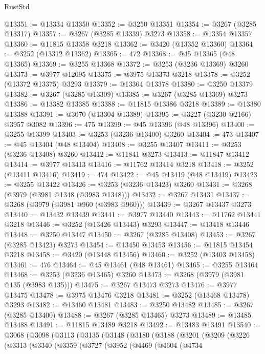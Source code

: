 \begin{lexlean}{RustStd}
\begin{coremodule}
@13351 := @13334 @13350
@13352 := @3250 @13351
@13354 := @3267 (@3285 @13317)
@13357 := @3267 (@3285 @13339) @3273
@13358 := @13354 @13357
@13360 := @11815 @13358 @3218
@13362 := @3420 (@13352 @13360)
@13364 := @3252 (@13312 @13362)
@13365 := 472
@13368 := @45 @13365 (@48 @13365)
@13369 := @3255 @13368
@13372 := @3253 (@3236 @13369) @3260
@13373 := @3977 @12095
@13375 := @3975 @13373 @3218
@13378 := @3252 (@13372 @13375) @3293
@13379 := @13364 @13378
@13380 := @3250 @13379
@13382 := @3267 (@3285 @13309)
@13385 := @3267 (@3285 @13369) @3273
@13386 := @13382 @13385
@13388 := @11815 @13386 @3218
@13389 := @13380 @13388
@13391 := @3070 (@13304 @13389)
@13395 := @3227 (@3230 @2166) @3957 @3082
@13396 := 475
@13399 := @45 @13396 (@48 @13396)
@13400 := @3255 @13399
@13403 := @3253 (@3236 @13400) @3260
@13404 := 473
@13407 := @45 @13404 (@48 @13404)
@13408 := @3255 @13407
@13411 := @3253 (@3236 @13408) @3260
@13412 := @11841 @3273
@13413 := @11847 @13412
@13414 := @3977 @13413
@13416 := @11762 @13414 @3218
@13418 := @3252 (@13411 @13416)
@13419 := 474
@13422 := @45 @13419 (@48 @13419)
@13423 := @3255 @13422
@13426 := @3253 (@3236 @13423) @3260
@13431 := @3268 (@3979 (@3981 @1348 (@3983 @1348)))
@13432 := @3267 @13431
@13437 := @3268 (@3979 (@3981 @960 (@3983 @960)))
@13439 := @3267 @13437 @3273
@13440 := @13432 @13439
@13441 := @3977 @13440
@13443 := @11762 @13441 @3218
@13446 := @3252 (@13426 @13443) @3293
@13447 := @13418 @13446
@13448 := @3250 @13447
@13450 := @3267 (@3285 @13408)
@13453 := @3267 (@3285 @13423) @3273
@13454 := @13450 @13453
@13456 := @11815 @13454 @3218
@13458 := @3420 (@13448 @13456)
@13460 := @3252 (@13403 @13458)
@13461 := 476
@13464 := @45 @13461 (@48 @13461)
@13465 := @3255 @13464
@13468 := @3253 (@3236 @13465) @3260
@13473 := @3268 (@3979 (@3981 @135 (@3983 @135)))
@13475 := @3267 @13473 @3273
@13476 := @3977 @13475
@13478 := @3975 @13476 @3218
@13481 := @3252 (@13468 @13478) @3293
@13482 := @13460 @13481
@13483 := @3250 @13482
@13485 := @3267 (@3285 @13400)
@13488 := @3267 (@3285 @13465) @3273
@13489 := @13485 @13488
@13491 := @11815 @13489 @3218
@13492 := @13483 @13491
@13540 := @3068
    (@3098
      (@3113
        (@3135
          (@3148
            (@3180
              (@3188
                (@3201
                  (@3209
                    (@3226
                      (@3313
                        (@3340
                          (@3359
                            (@3727
                              (@3952
                                (@4469
                                  (@4604
                                    (@4734

\end{coremodule}
\end{lexlean}
